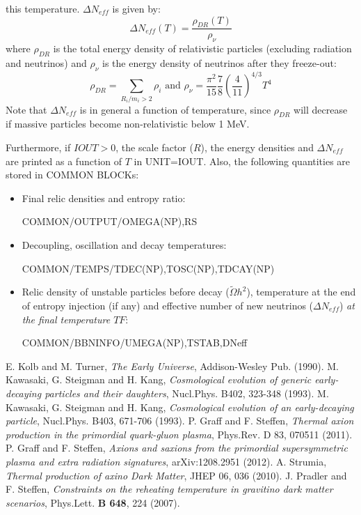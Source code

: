 \documentclass[preprint,notoc]{JHEP3}
\begin{document}
\begin{itemize}
this temperature. $\Delta N_{eff}$ is given by:
\begin{equation}
\Delta N_{eff}(T) = \frac{\rho_{DR}(T)}{\rho_{\nu}}
\end{equation}
where $\rho_{DR}$ is the total energy density of relativistic particles (excluding radiation and neutrinos) and $\rho_{\nu}$ is the energy density
of neutrinos after they freeze-out:
\begin{equation}
\rho_{DR} = \sum_{R_i/m_i > 2} \rho_i \mbox{ and } \rho_{\nu} = \frac{\pi^2}{15}\frac{7}{8}\left(\frac{4}{11}\right)^{4/3} T^4
\end{equation}
Note that $\Delta N_{eff}$ is in general a function of temperature, since $\rho_{DR}$ will decrease if massive particles become 
non-relativistic below 1 MeV.

\end{itemize}


Furthermore, if $IOUT>0$, the scale factor ($R$), the energy densities and  $\Delta N_{eff}$ are printed as a function of $T$ in UNIT=IOUT.
Also, the following quantities are stored in COMMON BLOCKs:
\begin{itemize}
\item Final relic densities and entropy ratio:
\begin{center}
COMMON/OUTPUT/OMEGA(NP),RS
\end{center}
\item Decoupling, oscillation and decay temperatures:
\begin{center}
COMMON/TEMPS/TDEC(NP),TOSC(NP),TDCAY(NP)
\end{center}
\item Relic density of unstable particles before decay ($\tilde{\Omega} h^2$), temperature at the end of entropy injection (if any) and
effective number of new neutrinos ($\Delta N_{eff}$) {\it at the final temperature $TF$}:
\begin{center}
COMMON/BBNINFO/UMEGA(NP),TSTAB,DNeff
\end{center}
\end{itemize}

%
\begin{thebibliography}{99}
%
 E. Kolb and M. Turner, {\it The Early Universe}, Addison-Wesley Pub. (1990).
%
 M. Kawasaki, G. Steigman and H. Kang, {\it Cosmological evolution of generic early-decaying
particles and their daughters}, Nucl.Phys. B402, 323-348 (1993).
%
 M. Kawasaki, G. Steigman and H. Kang, {\it Cosmological evolution of an early-decaying particle}, Nucl.Phys. B403, 671-706 (1993).
%
 P. Graff and F. Steffen, {\it Thermal axion production in the primordial quark-gluon plasma}, Phys.Rev. D 83, 070511 (2011).
%
 P. Graff and F. Steffen, {\it Axions and saxions from the primordial supersymmetric plasma and extra radiation signatures}, arXiv:1208.2951 (2012).
%
 A. Strumia, {\it Thermal production of axino Dark Matter}, JHEP 06, 036 (2010).
%
 J. Pradler and F. Steffen, {\it Constraints on the reheating temperature in gravitino dark matter scenarios}, Phys.Lett. {\bf B 648}, 224 (2007).
%
\end{thebibliography}
\end{document}

